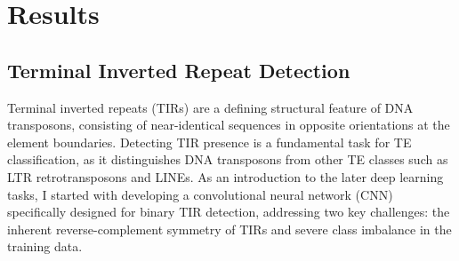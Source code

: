 \documentclass[12pt]{article}
\begin{document}

\clearpage
\section{Results}\label{sec:results}

\subsection{Terminal Inverted Repeat Detection}

Terminal inverted repeats (TIRs) are a defining structural feature of DNA transposons, consisting of near-identical sequences in opposite orientations at the element boundaries. Detecting TIR presence is a fundamental task for TE classification, as it distinguishes DNA transposons from other TE classes such as LTR retrotransposons and LINEs. As an introduction to the later deep learning tasks, I started with developing a convolutional neural network (CNN) specifically designed for binary TIR detection, addressing two key challenges: the inherent reverse-complement symmetry of TIRs and severe class imbalance in the training data.
\end{document}
